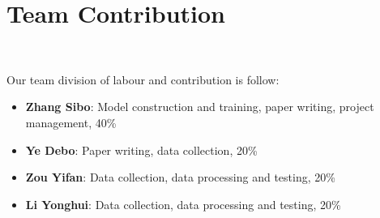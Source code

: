 \section{Team Contribution}
\

Our team division of labour and contribution is follow:
\begin{itemize}
    \item \textbf{Zhang Sibo}: Model construction and training, paper writing, project management, 40\% 
    \item \textbf{Ye Debo}: Paper writing, data collection, 20\%
    \item \textbf{Zou Yifan}: Data collection, data processing and testing, 20\%
    \item \textbf{Li Yonghui}: Data collection, data processing and testing, 20\%
\end{itemize}


